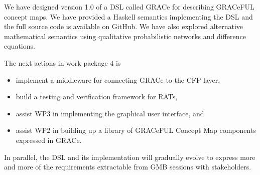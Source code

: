 \documentclass[]{article}
\begin{document}
We have designed version 1.0 of a DSL called GRACe for describing
GRACeFUL concept maps.
%
We have provided a Haskell semantics implementing the DSL and the full
source code is available on GitHub.
%
We have also explored alternative mathematical semantics using
qualitative probabilistic networks and difference equations.

The next actions in work package 4 is
\begin{itemize}
\item implement a middleware for connecting GRACe to the CFP layer,
\item build a testing and verification framework for RATs,
\item assist WP3 in implementing the graphical user interface, and
\item assist WP2 in building up a library of GRACeFUL Concept Map
  components expressed in GRACe.
\end{itemize}
%
In parallel, the DSL and its implementation will gradually evolve to
express more and more of the requirements extractable from GMB
sessions with stakeholders.





\end{document}
